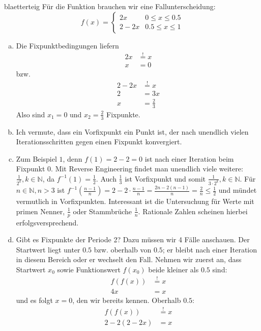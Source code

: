 \documentclass[%
<<<<<<< Updated upstream
<<<<<<< Updated upstream
11pt,%
twoside,%
titlepage,%
german,%
headsepline%
]{scrartcl}
\begin{document}
\begin{lsg}{blaetterteig}
F\"ur die Funktion brauchen wir eine Fallunterscheidung:
$$f(x)=\begin{cases}
2x & 0\leq x\leq0.5\\
2-2x & 0.5\leq x\leq1
\end{cases}$$

\begin{enumerate}[a)]
\item Die Fixpunktbedingungen liefern
\begin{align*}
2x &\stackrel{!}{=} x\\
x &= 0
\end{align*}
bzw.
\begin{align*}
2-2x &\stackrel{!}{=} x\\
2 &= 3x\\
x &=\frac{2}{3}
\end{align*}
Also sind $x_{1}=0$ und $x_{2}=\frac{2}{3}$ Fixpunkte.
\item Ich vermute, dass ein Vorfixpunkt ein Punkt ist, der nach unendlich vielen Iterationsschritten gegen einen Fixpunkt konvergiert.
\item Zum Beispiel $1$, denn $f(1)=2-2=0$ ist nach einer Iteration beim Fixpunkt $0$. Mit Reverse Engineering findet man unendlich viele weitere: $\frac{1}{2^{k}}, k\in\mathbb{N}$, da $f^{-1}(1)=\frac{1}{2}$. Auch $\frac{1}{3}$ ist Vorfixpunkt und somit $\frac{1}{3\cdot2^{k}}, k\in\mathbb{N}$. F\"ur $n\in\mathbb{N}, n>3$ ist $f^{-1}(\frac{n-1}{n})=2-2\cdot\frac{n-1}{n}=\frac{2n-2(n-1)}{n}=\frac{2}{n}\leq\frac{1}{2}$ und m\"undet vermutlich in Vorfixpunkten. Interessant ist die Untersuchung f\"ur Werte mit primen Nenner, $\frac{1}{p}$ oder Stammbr\"uche $\frac{1}{n}$. Rationale Zahlen scheinen hierbei erfolgsversprechend.
\item Gibt es Fixpunkte der Periode 2? Dazu m\"ussen wir 4 F\"alle anschauen. Der Startwert liegt unter $0.5$ bzw. oberhalb von $0.5$; er bleibt nach einer Iteration in diesem Bereich oder er wechselt den Fall. Nehmen wir zuerst an, dass Startwert $x_{0}$ sowie Funktionswert $f(x_{0})$ beide kleiner als $0.5$ sind:
\begin{align*}
f(f(x)) &\stackrel{!}{=} x\\
4x &= x
\end{align*}
und es folgt $x=0$, den wir bereits kennen. Oberhalb $0.5$:
\begin{align*}
f(f(x)) &\stackrel{!}{=} x\\
2-2(2-2x) &= x\\

\end{align*}
\end{enumerate}
\end{lsg}
\end{document}
